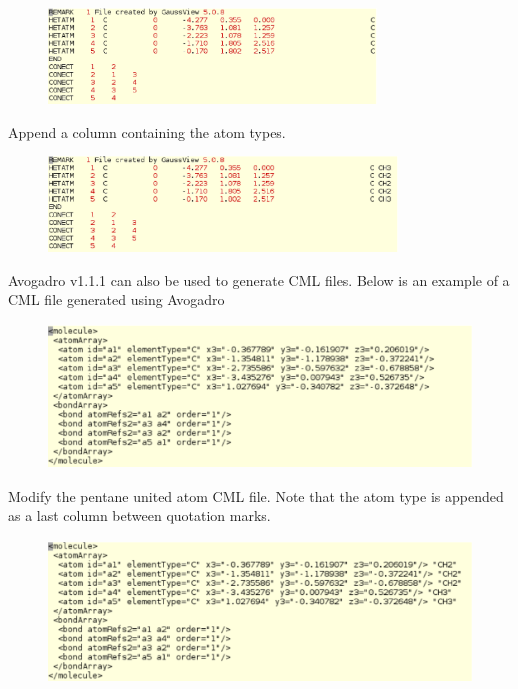 \begin{figure}[h]
\begin{center}
\includegraphics[height=1in]{pdbfile_final.eps}
\end{center}
\end{figure}

Append a column containing the atom types.

\begin{figure}[h]
\begin{center}
\includegraphics[height=1in]{pdbfile_edited_final.eps}
\end{center}
\end{figure}

Avogadro v1.1.1 can also be used to generate CML files. Below is an example of a 
CML file generated using Avogadro

\begin{figure}[h]
\begin{center}
\includegraphics[height=1.5in]{pentane_cml.eps}
\end{center}
\end{figure}

\vspace{3in}
Modify the pentane united atom CML file. Note that the atom type is appended as a last
column between quotation marks.

\begin{figure}[h]
\begin{center}
\includegraphics[height=1.5in]{pentane_cml_modified.eps}
\end{center}
\end{figure}


